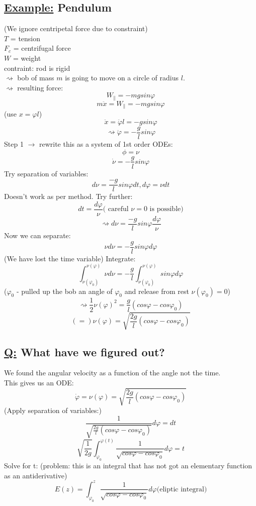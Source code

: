 \documentclass[a4paper, 12pt]{article}
\begin{document}
\subsection{\underline{Example:} Pendulum} 
\begin{tikzpicture}
\end{tikzpicture}
(We ignore centripetal force due to constraint)\\
$T$ = tension\\
$F_c$ = centrifugal force\\
$W$ = weight\\
contraint: rod is rigid\\
$\rightsquigarrow$ bob of mass $m$ is going to move on  a circle of radius $l$.\\ 
$\rightsquigarrow$ resulting force: $$W_{\parallel} =  - mg sin \varphi$$  $$m\ddot{x} = W_{\parallel} =  - mg sin \varphi$$ (use $ x = \varphi l$) $$\ddot{x} = \ddot{\varphi} l = - g sin \varphi$$ $$\rightsquigarrow \ddot{\varphi} = - \frac{g}{l} sin \varphi $$
Step 1 $\rightarrow$ rewrite this as a system of 1st order ODEs: $$\phi = \nu$$ $$ \dot{\nu} = - \frac{g}{l} sin \varphi $$
Try separation of variables:
$$d \nu = \frac{-g}{l} sin \varphi dt, d \varphi = \nu dt$$
Doesn't work as per method. Try further:
$$dt = \frac{d \varphi}{\nu} \text{( careful $\nu = 0$ is possible)}$$
$$\rightsquigarrow d\nu =\frac{-g}{l} sin \varphi \frac{d \varphi}{\nu}$$
Now we can separate: $$\nu d\nu = -\frac{g}{l} sin \varphi d \varphi $$
(We have lost the time variable) Integrate: $$\int_{\nu(\varphi_0)}^{\nu(\varphi)} \nu d \nu = -\frac{g}{l}\int_{\nu(\varphi_0)}^{\nu(\varphi)} sin \varphi d \varphi$$
($\varphi_0$ - pulled up the bob an angle of $\varphi_0$ and release from rest $\nu(\varphi_0) = 0$)
$$\rightsquigarrow \frac{1}{2} \nu (\varphi)^2 = \frac{g}{l}(cos \varphi - cos \varphi_0)$$
$$(=) \nu(\varphi) = \sqrt{\frac{2g}{l}(cos \varphi - cos \varphi_0)}$$
\subsection{\underline{Q:} What have we figured out?}
We found the angular velocity as a function of the angle not the time.\\
This gives us an ODE: $$\dot{\varphi} = \nu(\varphi) = \sqrt{\frac{2g}{l}(cos \varphi - cos \varphi_0)}$$
(Apply separation of variables:)$$\frac{1}{\sqrt{\frac{2g}{l}(cos \varphi - cos \varphi_0)}} d \varphi = dt$$
$$\sqrt{\frac{1}{2g}} \int_{\varphi_0}^{\varphi(t)} \frac{1}{\sqrt{cos \varphi - cos \varphi_0}} d \varphi = t$$
Solve for t: (problem: this is an integral that has not got an elementary function as an antiderivative)\\
$$E(z) = \int_{\varphi_0}^{z} \frac{1}{\sqrt{cos \varphi - cos \varphi_0}} d \varphi \text{(eliptic integral)}$$
\end{document}
